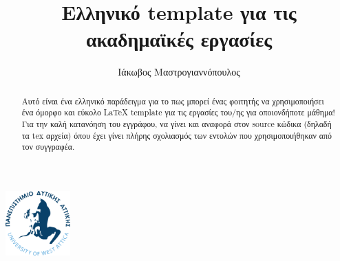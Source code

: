 \documentclass[
  11pt,
  singlespacing,
  liststotoc,
  toctotoc,
  headsepline
]{Assignments}
\title{Ελληνικό template για τις ακαδημαϊκές εργασίες} %
\author{Ιάκωβος Μαστρογιαννόπουλος} %
\institute{Πανεπιστημιο Δυτικης Αττικης \\ Τμημα Μηχανικων Πληροφορικης και Υπολογιστων} %
\begin{document}
\includegraphics[width=25mm]{Figures/Logo} %
\maketitle %

\begin{abstract}
  Αυτό είναι ένα ελληνικό παράδειγμα για το πως μπορεί ένας φοιτητής να χρησιμοποιήσει ένα όμορφο και εύκολο LaTeX template για τις εργασίες του/ης για οποιονδήποτε μάθημα!
  Για την καλή κατανόηση του εγγράφου, να γίνει και αναφορά στον source κώδικα (δηλαδή τα tex αρχεία) όπου έχει γίνει πλήρης σχολιασμός των εντολών που χρησιμοποιήθηκαν από τον συγγραφέα.
\end{abstract}

\newpage %
\tableofcontents %
\listoffigures %
\listoftables %

\newpage
\end{document}

